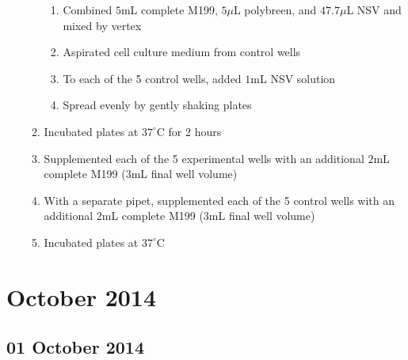 \begin{enumerate}
\begin{enumerate}
\begin{enumerate}
					\item Combined $5$mL complete M199, $5\mu$L polybreen, and $47.7\mu$L NSV and mixed by vertex
					\item Aspirated cell culture medium from control wells
					\item To each of the 5 control wells, added $1$mL NSV solution
					\item Spread evenly by gently shaking plates
				\end{enumerate}
			\item Incubated plates at $37^{\circ}$C for 2 hours
			\item Supplemented each of the 5 experimental wells with an additional $2$mL complete M199 ($3$mL final well volume)
			\item With a separate pipet, supplemented each of the 5 control wells with an additional $2$mL complete M199 ($3$mL final well volume)
			\item Incubated plates at $37^{\circ}$C
		\end{enumerate}
\end{enumerate}

\section{October 2014}

\subsection*{01 October 2014}

